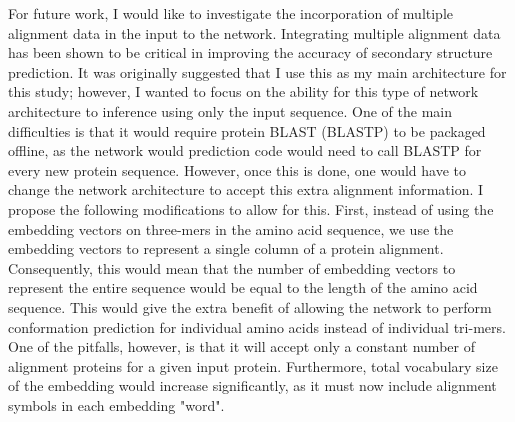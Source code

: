 \documentclass[pageno]{jpaper}
\begin{document}
\par
For future work, I would like to investigate the incorporation of multiple alignment data in the input to the network.  Integrating multiple alignment data has been shown to be critical in improving the accuracy of secondary structure prediction.  It was originally suggested that I use this as my main architecture for this study; however, I wanted to focus on the ability for this type of network architecture to inference using only the input sequence.  One of the main difficulties is that it would require protein BLAST (BLASTP) to be packaged offline, as the network would prediction code would need to call BLASTP for every new protein sequence.  However, once this is done, one would have to change the network architecture to accept this extra alignment information.  I propose the following modifications to allow for this.  First, instead of using the embedding vectors on three-mers in the amino acid sequence, we use the embedding vectors to represent a single column of a protein alignment.  Consequently, this would mean that the number of embedding vectors to represent the entire sequence would be equal to the length of the amino acid sequence.  This would give the extra benefit of allowing the network to perform conformation prediction for individual amino acids instead of individual tri-mers.  One of the pitfalls, however, is that it will accept only a constant number of alignment proteins for a given input protein.  Furthermore, total vocabulary size of the embedding would increase significantly, as it must now include alignment symbols in each embedding "word".
\end{document}
